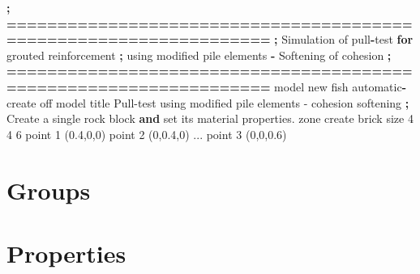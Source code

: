\documentclass[a4paper, nobind]{templates/ociamthesis}
\newenvironment{Shaded}{\begin{snugshade}}{\end{snugshade}}
\newcommand{\BuiltInTok}[1]{#1}
\newcommand{\ControlFlowTok}[1]{\textcolor[rgb]{0.13,0.29,0.53}{\textbf{#1}}}
\newcommand{\DecValTok}[1]{\textcolor[rgb]{0.00,0.00,0.81}{#1}}
\newcommand{\FloatTok}[1]{\textcolor[rgb]{0.00,0.00,0.81}{#1}}
\newcommand{\KeywordTok}[1]{\textcolor[rgb]{0.13,0.29,0.53}{\textbf{#1}}}
\newcommand{\NormalTok}[1]{#1}
\newcommand{\OperatorTok}[1]{\textcolor[rgb]{0.81,0.36,0.00}{\textbf{#1}}}
\newcommand{\StringTok}[1]{\textcolor[rgb]{0.31,0.60,0.02}{#1}}
\renewenvironment{Shaded}
{
  \vspace{10pt}%
  \begin{snugshade}%
}{%
  \end{snugshade}%
  \vspace{8pt}%
}
\begin{document}
\begin{Shaded}
\begin{Highlighting}[]
\OperatorTok{;} \OperatorTok{==================================================================}
\OperatorTok{;}\NormalTok{   Simulation of pull}\OperatorTok{{-}}\NormalTok{test }\ControlFlowTok{for}\NormalTok{ grouted reinforcement}
\OperatorTok{;}\NormalTok{   using modified pile elements }\OperatorTok{{-}}\NormalTok{ Softening of cohesion}
\OperatorTok{;} \OperatorTok{==================================================================}
\NormalTok{model new }
\NormalTok{fish automatic}\OperatorTok{{-}}\NormalTok{create off}
\NormalTok{model title }\StringTok{\textquotesingle{}Pull{-}test using modified pile elements {-} cohesion softening\textquotesingle{}}
\OperatorTok{;}\NormalTok{ Create a single rock block }\KeywordTok{and} \BuiltInTok{set}\NormalTok{ its material properties.}
\NormalTok{zone create brick size }\DecValTok{4} \DecValTok{4} \DecValTok{6}\NormalTok{ point }\DecValTok{1}\NormalTok{ (}\FloatTok{0.4}\NormalTok{,}\DecValTok{0}\NormalTok{,}\DecValTok{0}\NormalTok{) point }\DecValTok{2}\NormalTok{ (}\DecValTok{0}\NormalTok{,}\FloatTok{0.4}\NormalTok{,}\DecValTok{0}\NormalTok{) ...}
\NormalTok{                             point }\DecValTok{3}\NormalTok{ (}\DecValTok{0}\NormalTok{,}\DecValTok{0}\NormalTok{,}\FloatTok{0.6}\NormalTok{)}
\end{Highlighting}
\end{Shaded}

\hypertarget{groups-2}{%
\section{Groups}\label{groups-2}}

\hypertarget{properties-2}{%
\section{Properties}\label{properties-2}}
\end{document}
